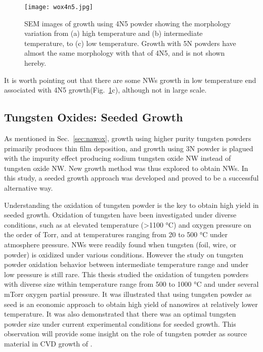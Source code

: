 \begin{figure}[htb]
\centering
\texttt{[image: wox4n5.jpg]}
\caption[SEM images of  growth using 4N5 powder]{SEM images of  growth using 4N5 powder showing the morphology variation from (a) high temperature and (b) intermediate temperature, to (c) low temperature. Growth with 5N powders have almost the same morphology with that of 4N5, and is not shown hereby.}
\label{fig:wox4n5}
\end{figure}
It is worth pointing out that there are some NWs growth in low temperature end associated with 4N5 growth(Fig.~\ref{fig:wox4n5}c), although not in large scale.

\subsection{Tungsten Oxides: Seeded Growth}\label{sec:sgfg}

As mentioned in Sec.~\ref{sec:nawox}, growth using higher purity tungsten powders primarily produces thin film deposition, and growth using 3N powder is plagued with the impurity effect producing sodium tungsten oxide NW instead of tungsten oxide NW. New growth method was thus explored to obtain  NWs. In this study, a seeded growth approach was developed and proved to be a successful alternative way. 

Understanding the oxidation of tungsten powder is the key to obtain high yield in seeded growth. Oxidation of tungsten have been investigated under diverse conditions, such as at elevated temperature (\textgreater 1100 \si{\degreeCelsius}) and oxygen pressure on the order of Torr,\cite{Base1965} and at temperatures ranging from 20 to 500 \si{\degreeCelsius} under atmosphere pressure.\cite{Warren1996}  NWs were readily found when tungsten (foil, wire, or powder) is oxidized under various conditions.\cite{Zhu1999,Karuppanan2007,Hsieh2010} However the study on tungsten powder oxidation behavior between intermediate temperature range and under low pressure is still rare. This thesis studied the oxidation of tungsten powders with diverse size within temperature range from 500 to 1000 \si{\degreeCelsius} and under several mTorr oxygen partial pressure. It was illustrated that using tungsten powder as seed is an economic approach to obtain high yield of  nanowires at relatively lower temperature. It was also demonstrated that there was an optimal tungsten powder size under current experimental conditions for seeded growth. This observation will provide some insight on the role of tungsten powder as source material in CVD growth of .

